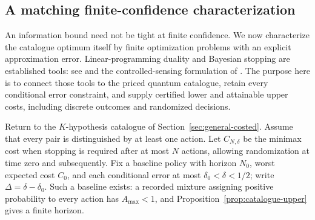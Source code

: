 \subsection{A matching finite-confidence characterization}
\label{sec:exact-catalogue}
An information bound need not be tight at finite confidence. We now
characterize the catalogue optimum itself by finite optimization problems
with an explicit approximation error. Linear-programming duality and
Bayesian stopping are established tools: see \citet[Theorems 4.1--4.2]{fauss2015}
and the controlled-sensing formulation of \citet[Theorems 1--3]{lisensor2019}.
The purpose here is to connect those tools to the priced quantum catalogue,
retain every conditional error constraint, and supply certified lower and
attainable upper costs, including discrete outcomes and randomized decisions.

Return to the $K$-hypothesis catalogue of Section~\ref{sec:general-costed}.
Assume that every pair is distinguished by at least one action. Let
$C_{N,\delta}$ be the minimax cost when stopping is required after at most
$N$ actions, allowing randomization at time zero and subsequently.
Fix a baseline policy with horizon $N_0$, worst expected cost $C_0$, and
each conditional error at most $\delta_0<\delta<1/2$; write
$\Delta=\delta-\delta_0$. Such a baseline exists: a recorded mixture
assigning positive probability to every action has $A_{\max}<1$, and
Proposition~\ref{prop:catalogue-upper} gives a finite horizon.

